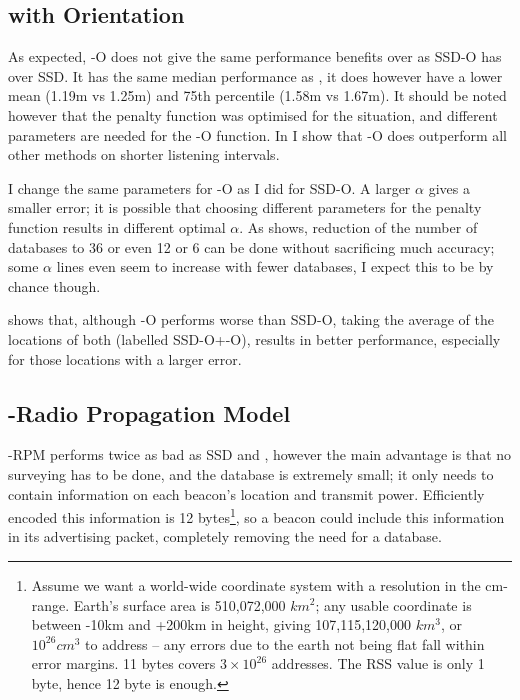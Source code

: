 \subsection{\BRP with Orientation}
As expected, \aBRP-O does not give the same performance benefits over \aBRP as SSD-O has over SSD.
It has the same median performance as \aBRP, it does however have a lower mean (1.19m vs 1.25m) and 75th percentile (1.58m vs 1.67m).
It should be noted however that the \aBRP penalty function was optimised for the \aBRP situation, and different parameters are needed for the \aBRP-O function.
In  I show that \aBRP-O does outperform all other methods on shorter listening intervals.

I change the same parameters for \aBRP-O as I did for SSD-O.
A larger $\alpha$ gives a smaller error; it is possible that choosing different parameters for the penalty function results in different optimal $\alpha$.
As  shows, reduction of the number of databases to 36 or even 12 or 6 can be done without sacrificing much accuracy; some $\alpha$ lines even seem to increase with fewer databases, I expect this to be by chance though.

 shows that, although \aBRP-O performs worse than SSD-O, taking the average of the locations of both (labelled SSD-O+\aBRP-O), results in better performance, especially for those locations with a larger error.

\subsection{\BRP-Radio Propagation Model}
\label{sec:architecture-measurements-brp-rpm}
\aBRP-RPM performs twice as bad as SSD and \aBRP, however the main advantage is that no surveying has to be done, and the database is extremely small; it only needs to contain information on each beacon's location and transmit power.
Efficiently encoded this information is 12 bytes\footnote{
    Assume we want a world-wide coordinate system with a resolution in the cm-range.
    Earth's surface area is 510,072,000 $km^2$; any usable coordinate is between -10km and +200km in height, giving 107,115,120,000 $km^3$, or $10^{26} cm^3$ to address -- any errors due to the earth not being flat fall within error margins.
    11 bytes covers $3\times 10^{26}$ addresses.
    The RSS value is only 1 byte, hence 12 byte is enough.
}, so a beacon could include this information in its advertising packet, completely removing the need for a database.

